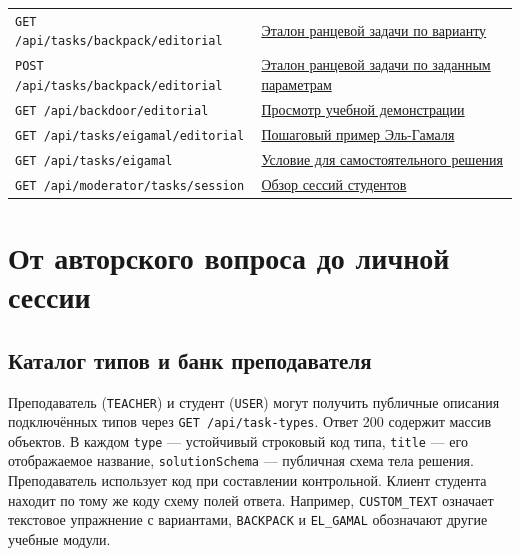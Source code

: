 \documentclass[12pt,a4paper]{article}
\begin{document}
{\begin{longtable}[]{@{}
  >{\raggedright\arraybackslash}p{}
  >{\raggedright\arraybackslash}p{}@{}}
\texttt{GET /\allowbreak{}api/\allowbreak{}tasks/\allowbreak{}backpack/\allowbreak{}editorial} & {\hyperlink{ранцевые-примеры}{Эталон ранцевой задачи по варианту}} \\
\texttt{POST /\allowbreak{}api/\allowbreak{}tasks/\allowbreak{}backpack/\allowbreak{}editorial} & {\hyperlink{ранцевые-примеры}{Эталон ранцевой задачи по заданным параметрам}} \\
\texttt{GET /\allowbreak{}api/\allowbreak{}backdoor/\allowbreak{}editorial} & {\hyperlink{учебная-демонстрация-со-скрытым-свойством}{Просмотр учебной демонстрации}} \\
\texttt{GET /\allowbreak{}api/\allowbreak{}tasks/\allowbreak{}eigamal/\allowbreak{}editorial} & {\hyperlink{задачи-эль-гамаля}{Пошаговый пример Эль-Гамаля}} \\
\texttt{GET /\allowbreak{}api/\allowbreak{}tasks/\allowbreak{}eigamal} & {\hyperlink{задачи-эль-гамаля}{Условие для самостоятельного решения}} \\
\texttt{GET /\allowbreak{}api/\allowbreak{}moderator/\allowbreak{}tasks/\allowbreak{}session} & {\hyperlink{обзор-сессий-при-модерации}{Обзор сессий студентов}} \\
\end{longtable}
}

\section{От авторского вопроса до личной сессии}\label{ux43eux442-ux430ux432ux442ux43eux440ux441ux43aux43eux433ux43e-ux432ux43eux43fux440ux43eux441ux430-ux434ux43e-ux43bux438ux447ux43dux43eux439-ux441ux435ux441ux441ux438ux438}

\hypertarget{от-авторского-вопроса-до-личной-сессии}{}

\subsection{Каталог типов и банк преподавателя}\label{ux43aux430ux442ux430ux43bux43eux433-ux442ux438ux43fux43eux432-ux438-ux431ux430ux43dux43a-ux43fux440ux435ux43fux43eux434ux430ux432ux430ux442ux435ux43bux44f}

\hypertarget{каталог-типов-и-банк-преподавателя}{}

Преподаватель (\texttt{TEACHER}) и студент (\texttt{USER}) могут получить публичные описания подключённых типов через \texttt{GET /\allowbreak{}api/\allowbreak{}task-\allowbreak{}types}. Ответ 200 содержит массив объектов. В каждом \texttt{type} --- устойчивый строковый код типа, \texttt{title} --- его отображаемое название, \texttt{solution\allowbreak{}Schema} --- публичная схема тела решения. Преподаватель использует код при составлении контрольной. Клиент студента находит по тому же коду схему полей ответа. Например, \texttt{CUSTOM\_\allowbreak{}TEXT} означает текстовое упражнение с вариантами, \texttt{BACKPACK} и \texttt{EL\_GAMAL} обозначают другие учебные модули.
\end{document}

